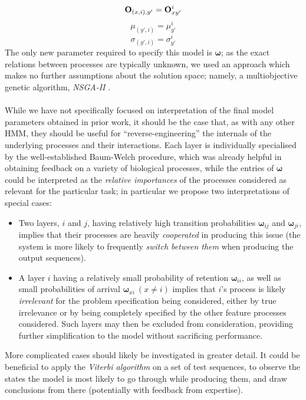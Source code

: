 \documentclass[12pt]{article}
\begin{document}
\begin{equation}
	{\bf O}_{(x, i), y'} = 	{\bf O}_{xy'}^i
	\end{equation}
\begin{equation}
	\mu_{(y', i)} = \mu_{y'}^i
	\end{equation}
\begin{equation}
	\sigma_{(y', i)} = \sigma_{y'}^i
	\end{equation}
	The only new parameter required to specify this model is $\boldsymbol\omega$; as the exact relations between processes are typically unknown, we used an approach which makes no further assumptions about the solution space; namely, a multiobjective genetic algorithm, \emph{NSGA-II} \cite{Deb02}.\\ \\
	While we have not specifically focused on interpretation of the final model parameters obtained in prior work, it should be the case that, as with any other HMM, they should be useful for ``reverse-engineering'' the internals of the underlying processes and their interactions. Each layer is individually specialised by the well-established Baum-Welch procedure, which was already helpful in obtaining feedback on a variety of biological processes, while the entries of $\boldsymbol\omega$ could be interpreted as the \emph{relative importances} of the processes considered as relevant for the particular task; in particular we propose two interpretations of special cases:
	\begin{itemize}
		\item Two layers, $i$ and $j$, having relatively high transition probabilities ${\boldsymbol\omega}_{ij}$ and ${\boldsymbol\omega}_{ji}$, implies that their processes are heavily \emph{cooperated} in producing this issue (the system is more likely to frequently \emph{switch between them} when producing the output sequences).
		\item A layer $i$ having a relatively small probability of retention ${\boldsymbol\omega}_{ii}$, as well as small probabilities of arrival ${\boldsymbol\omega}_{xi}\ (x \neq i)$ implies that $i$'s process is likely \emph{irrelevant} for the problem specification being considered, either by true irrelevance or by being completely specified by the other feature processes considered. Such layers may then be excluded from consideration, providing further simplification to the model without sacrificing performance.
	\end{itemize}
	More complicated cases should likely be investigated in greater detail. It could be beneficial to apply the \emph{Viterbi algorithm} on a set of test sequences, to observe the states the model is most likely to go through while producing them, and draw conclusions from there (potentially with feedback from expertise).
	
\end{document}
